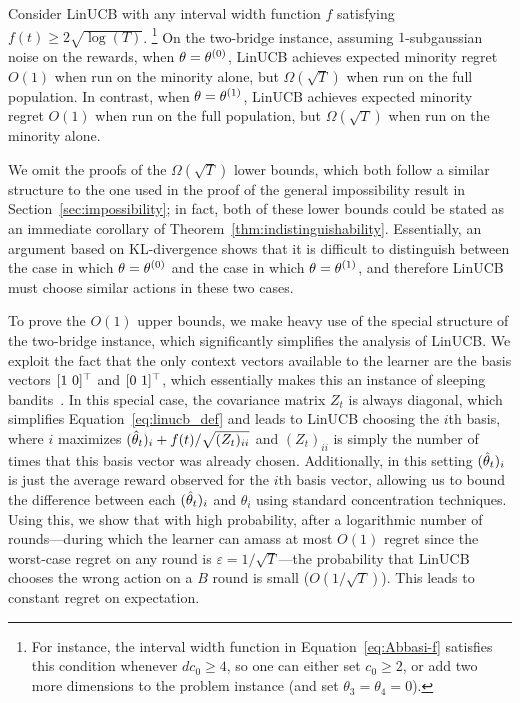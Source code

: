 \begin{theorem}
  Consider LinUCB with any interval width function $f$ satisfying
  $f(t) \ge 2\sqrt{\log(T)}$.%
  \footnote{For instance, the interval width function in Equation~\eqref{eq:Abbasi-f} satisfies this condition whenever $d c_0\geq 4$, so one can either set $c_0\geq 2$, or add two more dimensions to the problem instance (and set $\theta_3 = \theta_4 =0$).}
   On the two-bridge instance,
  assuming $1$-subgaussian noise on the rewards, when
  $\theta = \theta^{(0)}$, LinUCB achieves expected minority regret
  $O(1)$
  when run on the minority alone, but $\Omega(\sqrt{T})$ when run on
  the full population.  In contrast, when $\theta = \theta^{(1)}$, LinUCB
  achieves expected minority regret $O(1)$ when run on the full
  population, but $\Omega(\sqrt{T})$ when run on the minority alone.
\label{thm:twobridgelinucb}
\end{theorem}

We omit the proofs of the $\Omega(\sqrt{T})$ lower bounds, which both
follow a similar structure to the one used in the proof of the general
impossibility result in Section~\ref{sec:impossibility}; in fact, both
of these lower bounds could be stated as an immediate corollary of
Theorem~\ref{thm:indistinguishability}.  Essentially, an argument
based on KL-divergence shows that it is difficult to distinguish
between the case in which $\theta = \theta^{(0)}$ and the case in which
$\theta = \theta^{(1)}$, and therefore LinUCB must choose similar actions
in these two cases.

To prove the $O(1)$ upper bounds, we make heavy use of the special
structure of the two-bridge instance, which significantly simplifies
the analysis of LinUCB. We exploit the fact that the only context
vectors available to the learner are the basis vectors $[1 ~ 0]^{\top}$
and $[0 ~ 1]^{\top}$, which essentially makes this an instance of
sleeping bandits~\citep{SleepingBandits-ml10}. In this special case,
the covariance matrix $Z_t$ is always diagonal, which simplifies
Equation~\eqref{eq:linucb_def} and leads to LinUCB choosing the $i$th
basis, where $i$ maximizes $(\hat{\theta}_t)_i + f(t)/\sqrt{(Z_t)_{ii}}$ and
$(Z_t)_{ii}$ is simply the number of times that this basis vector was
already chosen. Additionally, in this setting $(\hat{\theta}_t)_i$ is just the
average reward observed for the $i$th basis vector, allowing us to
bound the difference between each $(\hat{\theta}_t)_i$ and $\theta_i$ using
standard concentration techniques. Using this, we show that with high
probability, after a logarithmic number of rounds---during which the
learner can amass at most $O(1)$ regret since the worst-case regret on
any round is $\varepsilon = 1/\sqrt{T}$---the probability that LinUCB
chooses the wrong action on a $B$ round is small ($O(1/\sqrt{T})$).
This leads to constant regret on expectation.



